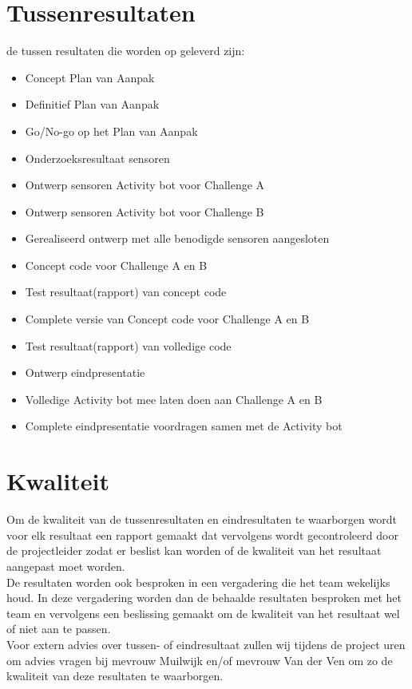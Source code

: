 \documentclass[oneside]{book}
\begin{document}
\chapter{Tussenresultaten}
	de tussen resultaten die worden op geleverd zijn:
\begin{itemize}
	\item Concept Plan van Aanpak
	\item Definitief Plan van Aanpak
	\item Go/No-go op het Plan van Aanpak
	\item Onderzoeksresultaat sensoren
	\item Ontwerp sensoren Activity bot voor Challenge A
	\item Ontwerp sensoren Activity bot voor Challenge B
	\item Gerealiseerd ontwerp met alle benodigde sensoren aangesloten
	\item Concept code voor Challenge A en B
	\item Test resultaat(rapport) van concept code
	\item Complete versie van Concept code voor Challenge A en B
	\item Test resultaat(rapport) van volledige code
	\item Ontwerp eindpresentatie
	\item Volledige Activity bot mee laten doen aan Challenge A en B
	\item Complete eindpresentatie voordragen samen met de Activity bot
\end{itemize}
\clearpage
\chapter{Kwaliteit}
Om de kwaliteit van de tussenresultaten en eindresultaten te waarborgen wordt voor elk resultaat een rapport gemaakt dat vervolgens wordt gecontroleerd door de projectleider zodat er beslist kan worden of de kwaliteit van het resultaat aangepast moet worden.\\  

De resultaten worden ook besproken in een vergadering die het team wekelijks houd. In deze vergadering worden dan de behaalde resultaten besproken met het team en vervolgens een beslissing gemaakt om de kwaliteit van het resultaat wel of niet aan te passen.\\ 

Voor extern advies over tussen-  of eindresultaat zullen wij tijdens de project uren om advies vragen bij mevrouw Muilwijk en/of mevrouw Van der Ven om zo de kwaliteit van deze resultaten te waarborgen. \\
\end{document}
